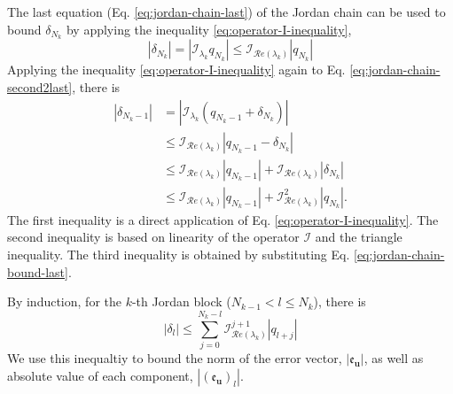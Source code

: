 \documentclass[accepted]{uai2023}
\newcommand{\vect}[1]{\mathbf{#1}}
\newcommand{\Err}{\mathfrak{e}}
\newcommand{\I}{\mathcal{I}}
\renewcommand{\Re}[1]{\mathcal{R}e\left(#1\right)}
\begin{document}
    The last equation (Eq. \ref{eq:jordan-chain-last}) of the Jordan chain can be used to bound $\delta_{N_k}$ by applying the inequality \ref{eq:operator-I-inequality}, 
    \begin{equation}\label{eq:jordan-chain-bound-last}
        |\delta_{N_k}| = \left|\I_{\lambda_k}q_{N_k}\right| \leq \I_{\Re{\lambda_k}} |q_{N_k}|
    \end{equation}
    Applying the inequality \ref{eq:operator-I-inequality} again to Eq. \ref{eq:jordan-chain-second2last}, there is
    \begin{align}
        |\delta_{N_k-1}| &= \left|\I_{\lambda_k}\left(q_{N_k - 1} + \delta_{N_k}\right)\right| \\
        &\leq \I_{\Re{\lambda_k}} |q_{N_k - 1} - \delta_{N_k}| \\
        &\leq \I_{\Re{\lambda_k}} |q_{N_k - 1}| + \I_{\Re{\lambda_k}} |\delta_{N_k}| \\
        &\leq \I_{\Re{\lambda_k}} |q_{N_k - 1}| + \I_{\Re{\lambda_k}}^2 |q_{N_k}|.
    \end{align}
    The first inequality is a direct application of Eq. \ref{eq:operator-I-inequality}. The second inequality is based on linearity of the operator $\I$ and the triangle inequality. The third inequality is obtained by substituting Eq. \ref{eq:jordan-chain-bound-last}.

    By induction, for the $k$-th Jordan block ($N_{k-1} < l \leq N_k$), there is
    \begin{equation}\label{eq:system-scalar-inequality-transformed}
        |\delta_{l}|  \leq \sum_{j=0}^{N_k - l} \I_{\Re{\lambda_k}} ^ {j+1} |q_{l+j}|
    \end{equation}
    We use this inequaltiy to bound the norm of the error vector, $\left|\Err_\vect{u}\right|$, as well as absolute value of each component, $\left|\left(\Err_{\vect{u}}\right)_l\right|$.
\end{document}
